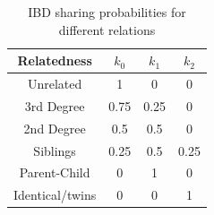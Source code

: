 \documentclass[12pt, letterpaper]{article}
\begin{document}
\begin{table}
\caption{\label{tab:Table 1}IBD sharing probabilities for different relations}
\begin{tabular}{|c|c|c|c|}
    \hline
    Relatedness & $k_0$ & $k_1$ & $k_2$\\
    \hline
    Unrelated & 1 & 0 & 0\\
    \hline
    3rd Degree & 0.75 & 0.25 & 0\\
    \hline
    2nd Degree & 0.5 & 0.5 & 0\\
    \hline
    Siblings & 0.25 & 0.5 & 0.25\\
    \hline
    Parent-Child & 0 & 1 & 0\\
    \hline
    Identical/twins & 0 & 0 & 1\\
    \hline
\end{tabular}

\end{table}
\end{document}
